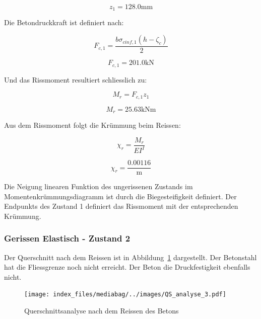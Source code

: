\documentclass[
  letterpaper,
]{scrreprt}
\begin{document}
\begin{equation}z_{1} = 128.0 \text{mm}\end{equation}

Die Betondruckkraft ist definiert nach:

\begin{equation}F_{c,1} = \frac{b \sigma_{c inf,1} \left(h - \zeta_{c}\right)}{2}\end{equation}

\begin{equation}F_{c,1} = 201.0 \text{kN}\end{equation}

Und das Rissmoment resultiert schliesslich zu:

\begin{equation}M_{r} = F_{c,1} z_{1}\end{equation}

\begin{equation}M_{r} = 25.63 \text{kN} \text{m}\end{equation}

Aus dem Rissmoment folgt die Krümmung beim Reissen:

\begin{equation}\chi_{r} = \frac{M_{r}}{EI^{I}}\end{equation}

\begin{equation}\chi_{r} = \frac{0.00116}{\text{m}}\end{equation}

Die Neigung linearen Funktion des ungerissenen Zustands im
Momentenkrümmungsdiagramm ist durch die Biegesteifigkeit definiert. Der
Endpunkts des Zustand 1 definiert das Rissmoment mit der entsprechenden
Krümmung.

\hypertarget{gerissen-elastisch---zustand-2}{%
\subsubsection{Gerissen Elastisch - Zustand
2}\label{gerissen-elastisch---zustand-2}}

Der Querschnitt nach dem Reissen ist in Abbildung~\ref{fig-qs3}
dargestellt. Der Betonstahl hat die Fliessgrenze noch nicht erreicht.
Der Beton die Druckfestigkeit ebenfalls nicht.

\begin{figure}[H]

{\centering \texttt{[image: index\_files/mediabag/../images/QS\_analyse\_3.pdf]}

}

\caption{\label{fig-qs3}Querschnittsanalyse nach dem Reissen des Betons}

\end{figure}
\end{document}
